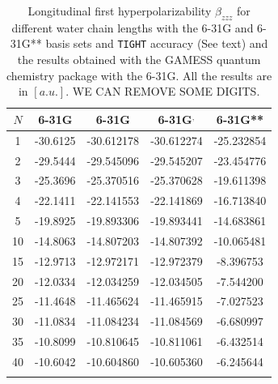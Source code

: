 \documentclass[prl,aps,twocolumn,showpacs,twocolumngrid,superbib]{revtex4}
\begin{document}
\begin{table}
  \centering
  \caption{\protect
    Longitudinal first hyperpolarizability $\beta_{zzz}$
    for different water chain lengths with the 6-31G and 6-31G** basis sets
    and {\tt TIGHT} accuracy (See text) and the results obtained with
    the GAMESS quantum chemistry package \cite{gamess} with the 6-31G. 
    All the results are in $[a.u.]$.
    WE CAN REMOVE SOME DIGITS.
  }\label{tab:Beta_1D_Values}
  \begin{tabular}{ccccc}
    \toprule
    $N$ &\multicolumn{1}{c}{6-31G\footnotemark[1]}
    &\multicolumn{1}{c}{6-31G\footnotemark[2]}
    &\multicolumn{1}{c}{6-31G\footnotemark[2]$^,$\footnotemark[3]}
    &\multicolumn{1}{c}{6-31G**}\footnotemark[2] \\
    \hline
     1 & -30.6125 & -30.612178 & -30.612274 & -25.232854 \\
     2 & -29.5444 & -29.545096 & -29.545207 & -23.454776 \\
     3 & -25.3696 & -25.370516 & -25.370628 & -19.611398 \\
     4 & -22.1411 & -22.141553 & -22.141869 & -16.713840 \\
     5 & -19.8925 & -19.893306 & -19.893441 & -14.683861 \\
    10 & -14.8063 & -14.807203 & -14.807392 & -10.065481 \\
    15 & -12.9713 & -12.972171 & -12.972379 &  -8.396753 \\
    20 & -12.0334 & -12.034259 & -12.034505 &  -7.544200 \\
    25 & -11.4648 & -11.465624 & -11.465915 &  -7.027523 \\
    30 & -11.0834 & -11.084234 & -11.084569 &  -6.680997 \\
    35 & -10.8099 & -10.810645 & -10.811061 &  -6.432514 \\
    40 & -10.6042 & -10.604860 & -10.605360 &  -6.245644 \\
    \botrule
  \end{tabular}
\end{table}
\end{document}
